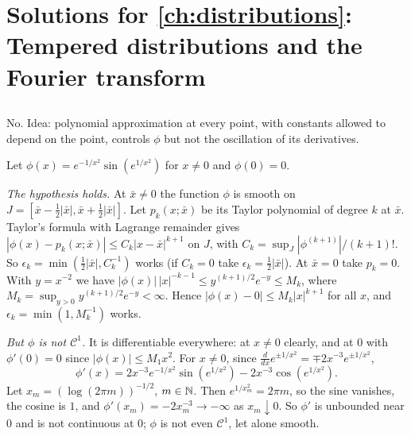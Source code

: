 \providecommand{\oRC}[1]{{}^{1}\overline{#1}}       %
\providecommand{\qRC}[1]{{}^{q}\overline{#1}}       %
\providecommand{\relRC}[2]{{}^{#1}\overline{#2}}    %

\section{Solutions for \cref{ch:distributions}: Tempered distributions and the Fourier transform}\label{solutions:distributions}

\subsection*{}
No. Idea: polynomial approximation at every point, with constants allowed to depend on
the point, controls $\phi$ but not the oscillation of its derivatives.

Let $\phi(x)=e^{-1/x^2}\sin(e^{1/x^2})$ for $x\neq0$ and $\phi(0)=0$.

\emph{The hypothesis holds.} At $\bar x\neq0$ the function $\phi$ is smooth on
$J=[\bar x-\frac12|\bar x|,\bar x+\frac12|\bar x|]$. Let $p_k(x;\bar x)$ be its Taylor
polynomial of degree $k$ at $\bar x$. Taylor's formula with Lagrange remainder gives
$|\phi(x)-p_k(x;\bar x)|\le C_k|x-\bar x|^{k+1}$ on $J$, with
$C_k=\sup_J|\phi^{(k+1)}|/(k+1)!$. So $\epsilon_k=\min(\frac12|\bar x|,C_k^{-1})$ works
(if $C_k=0$ take $\epsilon_k=\frac12|\bar x|$). At $\bar x=0$ take $p_k=0$. With
$y=x^{-2}$ we have $|\phi(x)|\,|x|^{-k-1}\le y^{(k+1)/2}e^{-y}\le M_k$, where
$M_k=\sup_{y>0}y^{(k+1)/2}e^{-y}<\infty$. Hence $|\phi(x)-0|\le M_k|x|^{k+1}$ for all $x$,
and $\epsilon_k=\min(1,M_k^{-1})$ works.

\emph{But $\phi$ is not $\mathcal{C}^1$.} It is differentiable everywhere: at $x\ne0$
clearly, and at $0$ with $\phi'(0)=0$ since $|\phi(x)|\le M_1x^2$. For $x\neq0$, since
$\frac d{dx}e^{\pm1/x^2}=\mp2x^{-3}e^{\pm1/x^2}$,
\[
  \phi'(x)=2x^{-3}e^{-1/x^2}\sin(e^{1/x^2})-2x^{-3}\cos(e^{1/x^2}).
\]
Let $x_m=(\log(2\pi m))^{-1/2}$, $m\in\mathbb{N}$. Then $e^{1/x_m^2}=2\pi m$, so the sine
vanishes, the cosine is $1$, and $\phi'(x_m)=-2x_m^{-3}\to-\infty$ as $x_m\downarrow0$.
So $\phi'$ is unbounded near $0$ and is not continuous at $0$; $\phi$ is not even
$\mathcal{C}^1$, let alone smooth.

